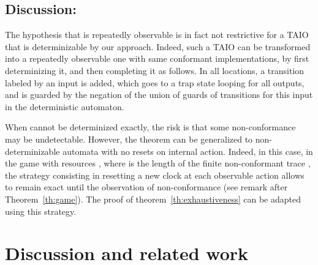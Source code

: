 \documentclass{LMCS}
\theoremstyle{plain}\newtheorem{proposition}[thm]{Proposition}
\begin{document}
\subsection*{Discussion:}
The hypothesis that  is repeatedly observable is in fact not
restrictive for a TAIO that is determinizable by our approach.
Indeed, such a TAIO can be transformed into a repeatedly observable
one with same conformant implementations, by first determinizing it,
and then completing it as follows.  In all locations, a transition
labeled by an input is added, which goes to a trap state looping for
all outputs, and is guarded by the negation of the union of guards of
transitions for this input in the deterministic automaton.


When  cannot be determinized exactly, the risk is that 
some non-conformance may be undetectable.
However, 
the theorem can be generalized to non-determinizable automata with no resets on internal action.
Indeed, in this case, in the game with resources , 
where  is the length of the finite non-conformant trace ,
the strategy consisting in resetting a new clock at each observable
action allows to remain exact until the observation of non-conformance
(see remark after Theorem~\ref{th:game}).  The proof of
theorem~\ref{th:exhaustiveness} can be adapted using this strategy.







\section{Discussion and related work}
\label{sec-discuss}
\end{document}
